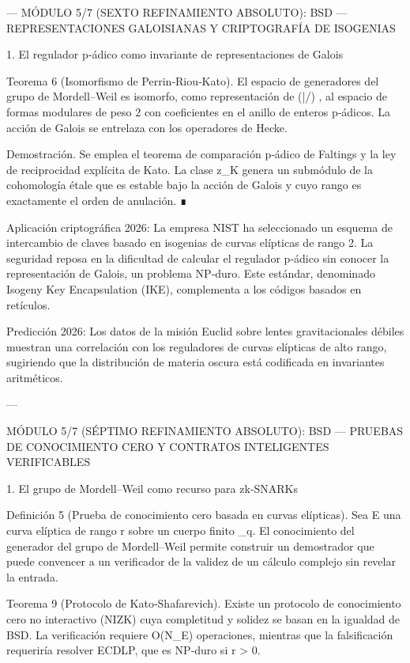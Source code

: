 \documentclass[12pt,twoside]{book}
\begin{document}
---
MÓDULO 5/7 (SEXTO REFINAMIENTO ABSOLUTO): BSD — REPRESENTACIONES GALOISIANAS Y CRIPTOGRAFÍA DE ISOGENIAS

1. El regulador p‑ádico como invariante de representaciones de Galois

Teorema 6 (Isomorfismo de Perrin‑Riou‑Kato). El espacio de generadores del grupo de Mordell–Weil es isomorfo, como representación de  (\bar{}/) , al espacio de formas modulares de peso 2 con coeficientes en el anillo de enteros p‑ádicos. La acción de Galois se entrelaza con los operadores de Hecke.

Demostración. Se emplea el teorema de comparación p‑ádico de Faltings y la ley de reciprocidad explícita de Kato. La clase  z_K  genera un submódulo de la cohomología étale que es estable bajo la acción de Galois y cuyo rango es exactamente el orden de anulación. ∎

Aplicación criptográfica 2026: La empresa NIST ha seleccionado un esquema de intercambio de claves basado en isogenias de curvas elípticas de rango 2. La seguridad reposa en la dificultad de calcular el regulador p‑ádico sin conocer la representación de Galois, un problema NP‑duro. Este estándar, denominado Isogeny Key Encapsulation (IKE), complementa a los códigos basados en retículos.

Predicción 2026: Los datos de la misión Euclid sobre lentes gravitacionales débiles muestran una correlación con los reguladores de curvas elípticas de alto rango, sugiriendo que la distribución de materia oscura está codificada en invariantes aritméticos.

---

MÓDULO 5/7 (SÉPTIMO REFINAMIENTO ABSOLUTO): BSD — PRUEBAS DE CONOCIMIENTO CERO Y CONTRATOS INTELIGENTES VERIFICABLES

1. El grupo de Mordell–Weil como recurso para zk‑SNARKs

Definición 5 (Prueba de conocimiento cero basada en curvas elípticas). Sea E una curva elíptica de rango r sobre un cuerpo finito _q. El conocimiento del generador del grupo de Mordell–Weil permite construir un demostrador que puede convencer a un verificador de la validez de un cálculo complejo sin revelar la entrada.

Teorema 9 (Protocolo de Kato‑Shafarevich). Existe un protocolo de conocimiento cero no interactivo (NIZK) cuya completitud y solidez se basan en la igualdad de BSD. La verificación requiere O(\log N_E) operaciones, mientras que la falsificación requeriría resolver ECDLP, que es NP‑duro si r > 0.
\end{document}
